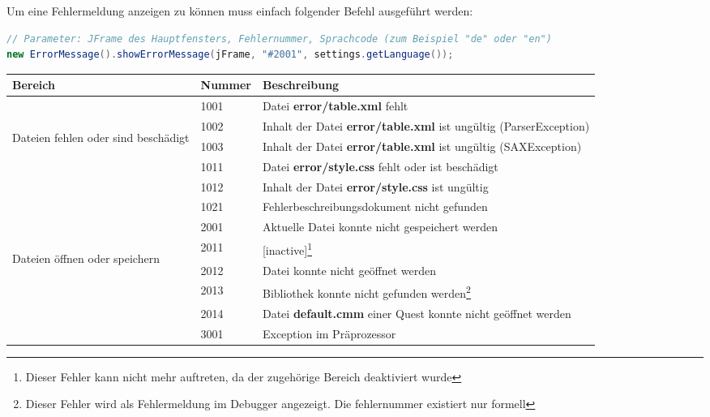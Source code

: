 Um eine Fehlermeldung anzeigen zu können muss einfach folgender Befehl ausgeführt werden:
\begin{lstlisting}[language=JAVA]
// Parameter: JFrame des Hauptfensters, Fehlernummer, Sprachcode (zum Beispiel "de" oder "en")
new ErrorMessage().showErrorMessage(jFrame, "#2001", settings.getLanguage());
\end{lstlisting}

\def\arraystretch{1.6}
\begin{minipage}{14cm}
\begin{tabular}{l|l|l}
	Bereich&Nummer&Beschreibung\\
	\hline
	&1001&Datei \textbf{error/table.xml} fehlt\\
	\multirow{5}{15mm}{\begin{sideways}\parbox{35mm}{Dateien fehlen oder sind beschädigt}\end{sideways}}&1002&Inhalt der Datei \textbf{error/table.xml} ist ungültig (ParserException)\\
	&1003&Inhalt der Datei \textbf{error/table.xml} ist ungültig (SAXException)\\
	&1011&Datei \textbf{error/style.css} fehlt oder ist beschädigt\\
	&1012&Inhalt der Datei \textbf{error/style.css} ist ungültig\\
	&1021&Fehlerbeschreibungsdokument nicht gefunden\\
	\hline
	&2001&Aktuelle Datei konnte nicht gespeichert werden\\
	\multirow{4}{15mm}{\begin{sideways}\parbox{25mm}{Dateien öffnen oder speichern}\end{sideways}}&2011&[inactive]\footnote{Dieser Fehler kann nicht mehr auftreten, da der zugehörige Bereich deaktiviert wurde}\\
	&2012&Datei konnte nicht geöffnet werden\\
	&2013&Bibliothek konnte nicht gefunden werden\footnote{Dieser Fehler wird als Fehlermeldung im Debugger angezeigt. Die fehlernummer existiert nur formell}\\%
	&2014&Datei \textbf{default.cmm} einer Quest konnte nicht geöffnet werden\\%
	\hline
	&3001&Exception im Präprozessor\\

\end{tabular}
\end{minipage}
